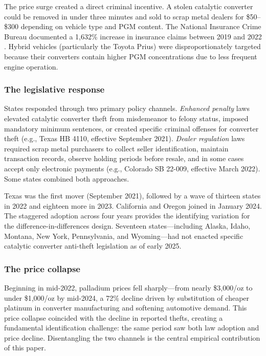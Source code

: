 \documentclass[12pt]{article}
\begin{document}
The price surge created a direct criminal incentive. A stolen catalytic converter could be removed in under three minutes and sold to scrap metal dealers for \$50--\$300 depending on vehicle type and PGM content. The National Insurance Crime Bureau documented a 1,632\% increase in insurance claims between 2019 and 2022 \citep{nicb2023catalytic}. Hybrid vehicles (particularly the Toyota Prius) were disproportionately targeted because their converters contain higher PGM concentrations due to less frequent engine operation.

\subsubsection*{The legislative response} States responded through two primary policy channels. \textit{Enhanced penalty} laws elevated catalytic converter theft from misdemeanor to felony status, imposed mandatory minimum sentences, or created specific criminal offenses for converter theft (e.g., Texas HB 4110, effective September 2021). \textit{Dealer regulation} laws required scrap metal purchasers to collect seller identification, maintain transaction records, observe holding periods before resale, and in some cases accept only electronic payments (e.g., Colorado SB 22-009, effective March 2022). Some states combined both approaches.

Texas was the first mover (September 2021), followed by a wave of thirteen states in 2022 and eighteen more in 2023. California and Oregon joined in January 2024. The staggered adoption across four years provides the identifying variation for the difference-in-differences design. Seventeen states---including Alaska, Idaho, Montana, New York, Pennsylvania, and Wyoming---had not enacted specific catalytic converter anti-theft legislation as of early 2025.

\subsubsection*{The price collapse} Beginning in mid-2022, palladium prices fell sharply---from nearly \$3,000/oz to under \$1,000/oz by mid-2024, a 72\% decline driven by substitution of cheaper platinum in converter manufacturing and softening automotive demand. This price collapse coincided with the decline in reported thefts, creating a fundamental identification challenge: the same period saw both law adoption and price decline. Disentangling the two channels is the central empirical contribution of this paper.
\end{document}
